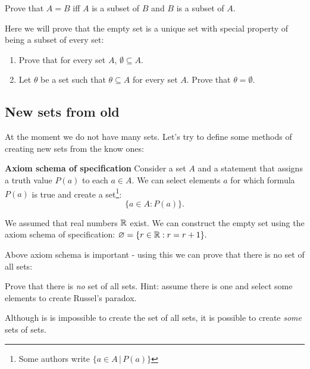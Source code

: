 \begin{exercise}
  Prove that $A=B$ iff $A$ is a subset of $B$ and $B$ is a subset of $A$.
\end{exercise}

\begin{exercise}
  Here we will prove that the empty set is a unique set with special property of being a subset of every set:
  \begin{enumerate}
    \item Prove that for every set $A$, $\emptyset\subseteq A$.
    \item Let $\theta$ be a set such that $\theta \subseteq A$ for every set $A$. Prove that $\theta=\emptyset$.
  \end{enumerate}
\end{exercise}

\subsection{New sets from old}
At the moment we do not have many sets. Let's try to define some methods of creating new sets from the know ones:

\begin{definition}
  \textbf{Axiom schema of specification} Consider a set $A$ and a statement that assigns a truth value $P(a)$ to each $a\in A$. We can select elements $a$
  for which formula $P(a)$ is true and create a set\footnote{Some authors write $\{a\in A\,|\,P(a)\}$}:
  $$\{a\in A : P(a)\}.$$
\end{definition}

\begin{example}
  We assumed that real numbers $\mathbb R$ exist. We can construct the empty set using the axiom schema of specification:
  $\varnothing=\{r\in\mathbb R : r=r+1\}.$
\end{example}

Above axiom schema is important - using this we can prove that there is no set of all sets:
\begin{exercise}
  Prove that there is \textit{no} set of all sets. Hint: assume there is one and select some elements to create Russel's paradox.
\end{exercise}

Although is is impossible to create the set of all sets, it is possible to create \textit{some} sets of sets.

